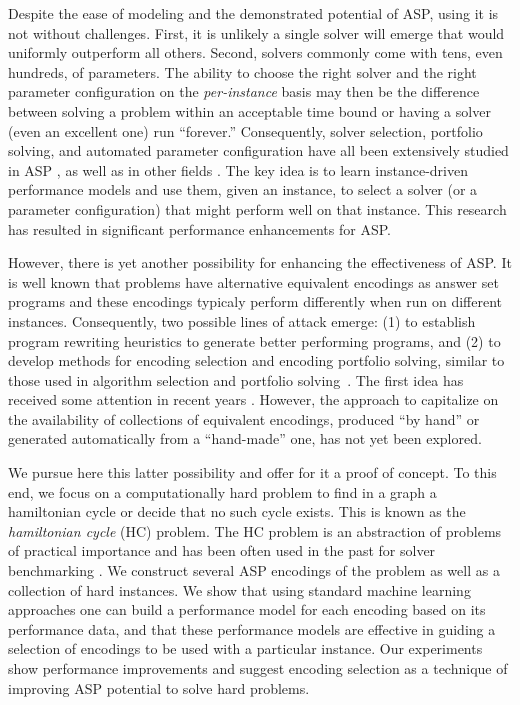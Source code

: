 \documentclass{new_tlp}
\begin{document}
Despite the ease of modeling and the demonstrated potential of ASP, using it is 
not without challenges. First, it is unlikely a single solver will emerge
that would uniformly outperform all others. Second, solvers commonly come
with tens, even hundreds, of parameters. The ability to choose the right 
solver and the right parameter configuration on the \emph{per-instance} 
basis may then be the difference between solving a problem within an acceptable 
time bound or having a solver (even an excellent one) run ``forever.'' 
Consequently, 
solver selection, portfolio solving, and automated parameter configuration 
have all been 
extensively studied in ASP \cite{MarateaPR14,HoosLS14}, as well as 
in other fields \cite{Rice76,KerschkeHNT19}. The key idea is to learn
instance-driven performance models and use them, given an instance, to
select a solver (or a parameter configuration) that might perform well
on that instance. 
This research has resulted in significant performance enhancements for ASP. 

However, there is yet another possibility for enhancing the effectiveness 
of ASP. It is well known that problems have alternative equivalent encodings 
as answer set programs and these encodings typicaly perform differently when 
run on different instances. Consequently, two possible lines of attack emerge: 
(1) to establish program rewriting heuristics to generate better performing 
programs, and (2) to develop methods for encoding selection and encoding 
portfolio solving, similar to those used in algorithm selection and 
portfolio solving~\cite{GomesS01,HoosLS14}. The first idea has received some 
attention in recent years \cite{BuddenhagenL15,BichlerMW16,HippenL19}. 
However, the approach to capitalize on the availability of collections of 
equivalent encodings, produced ``by hand'' or generated automatically from 
a ``hand-made'' one, has not yet been explored.

We pursue here this latter possibility and offer for it a proof of concept.
To this end, we focus on a computationally hard problem to find in a graph
a hamiltonian cycle or decide that no such cycle exists. This is known
as the \emph{hamiltonian cycle} (HC) problem. The HC problem is an abstraction 
of problems of practical importance and has been often used in the past for 
solver benchmarking \cite{1staspcomp,2ndaspcomp}. We construct several ASP encodings of 
the problem as well as a collection of hard instances. We show that using 
standard machine learning approaches one can build a performance model for
each encoding based on its performance data, and that these performance models 
are effective in guiding a selection of encodings to be used with a particular 
instance. Our experiments show performance improvements and suggest encoding 
selection as a technique of improving ASP potential to solve hard problems.
\end{document}
